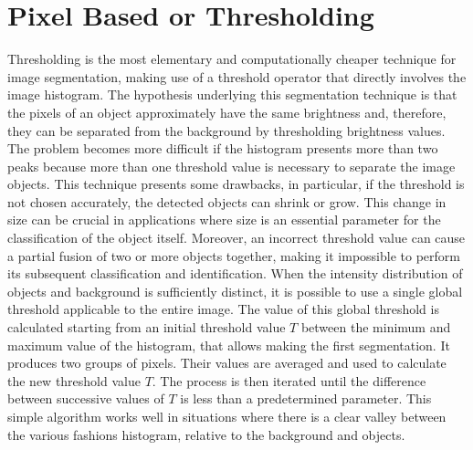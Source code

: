 \section{Pixel Based or Thresholding} %
Thresholding is the most elementary and computationally cheaper technique for image segmentation, making use of a threshold operator that directly involves the image histogram. The hypothesis underlying this segmentation technique is that the pixels of an object approximately have the same brightness and, therefore, they can be separated from the background by thresholding brightness values. The problem becomes more difficult if the histogram presents more than two peaks because more than one threshold value is necessary to separate the image objects. This technique presents some drawbacks, in particular, if the threshold is not chosen accurately, the detected objects can shrink or grow. This change in size can be crucial in applications where size is an essential parameter for the classification of the object itself.
Moreover, an incorrect threshold value can cause a partial fusion of two or more objects together, making it impossible to perform its subsequent classification and identification. When the intensity distribution of objects and background is sufficiently distinct, it is possible to use a single global threshold \cite{Gonz, GonzMAT} applicable to the entire image. The value of this global threshold is calculated starting from an initial threshold value $T$ between the minimum and maximum value of the histogram, that allows making the first segmentation. It produces two groups of pixels. Their values are averaged and used to calculate the new threshold value $T$. The process is then iterated until the difference between successive values of $T$ is less than a predetermined parameter. This simple algorithm works well in situations where there is a clear valley between the various fashions histogram, relative to the background and objects.

